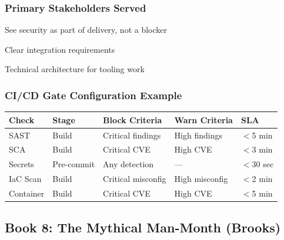 \documentclass[11pt,letterpaper]{article}
\begin{document}
\subsubsection{Primary Stakeholders Served}

\begin{stakeholderbox}
\begin{description}[nosep, leftmargin=2.5cm]
    \item[Engineering Org] See security as part of delivery, not a blocker
    \item[Platform/DevOps] Clear integration requirements
    \item[AppSec Engineers] Technical architecture for tooling work
\end{description}
\end{stakeholderbox}

\subsubsection{CI/CD Gate Configuration Example}

\begin{center}
\renewcommand{\arraystretch}{1.3}
\footnotesize
\begin{tabular}{p{2.5cm}p{2cm}p{2.5cm}p{2.5cm}p{2.5cm}}
\toprule
\textbf{Check} & \textbf{Stage} & \textbf{Block Criteria} & \textbf{Warn Criteria} & \textbf{SLA} \\
\midrule
SAST & Build & Critical findings & High findings & $<$5 min \\
SCA & Build & Critical CVE & High CVE & $<$3 min \\
Secrets & Pre-commit & Any detection & --- & $<$30 sec \\
IaC Scan & Build & Critical misconfig & High misconfig & $<$2 min \\
Container & Build & Critical CVE & High CVE & $<$5 min \\
\bottomrule
\end{tabular}
\end{center}

\newpage

\subsection{Book 8: The Mythical Man-Month (Brooks)}
\end{document}
